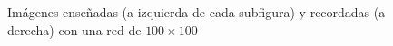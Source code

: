 \documentclass[11pt]{article} %
\begin{document}
\begin{figure}[h!]
\begin{minipage}{0.48\linewidth}
    \end{minipage}\hfill
    \begin{minipage}{0.48\linewidth}
        \centering
        \\
        \\
    \end{minipage}
\caption{\centering Imágenes enseñadas (a izquierda de cada subfigura) y recordadas (a derecha) con una red de $100 \times 100$}
    \label{fig:ej1_4_2}
\end{figure}
\end{document}
